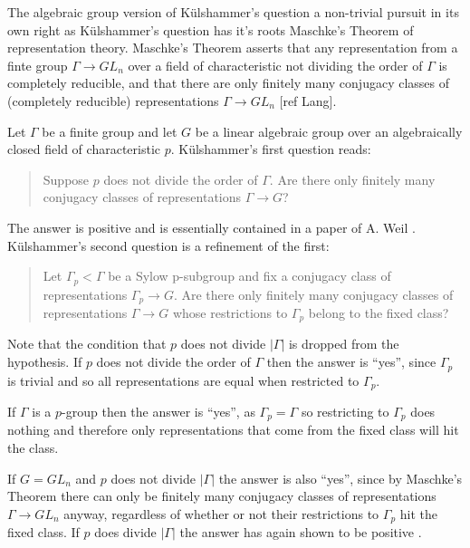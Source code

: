The algebraic group version of K\"ulshammer's question a non-trivial pursuit in its own right as K\"ulshammer's question has it's roots Maschke's Theorem of representation theory. Maschke's Theorem asserts that any representation from a finte group $\Gamma \rightarrow GL_n$ over a field of characteristic not dividing the order of $\Gamma$ is completely reducible, and that there are only finitely many conjugacy classes of (completely reducible) representations $\Gamma \rightarrow GL_n$ [ref Lang].

Let $\Gamma$ be a finite group and let $G$ be a linear algebraic group over an algebraically closed field of characteristic $p$. K\"ulshammer's first question reads:
\begin{quote}
  Suppose $p$ does not divide the order of $\Gamma$. Are there only finitely many conjugacy classes of representations $\Gamma\rightarrow G$?
\end{quote}
The answer is positive and is essentially contained in a paper of A. Weil \cite{weil1964remarks}. K\"ulshammer's second question is a refinement of the first:
\begin{quote}
  Let $\Gamma_p < \Gamma$ be a Sylow p-subgroup and fix a conjugacy class of representations $\Gamma_p\rightarrow G$. Are there only finitely many conjugacy classes of representations $\Gamma\rightarrow G$ whose restrictions to $\Gamma_p$ belong to the fixed class?
\end{quote}
Note that the condition that $p$ does not divide $|\Gamma|$ is dropped from the hypothesis. If $p$ does not divide the order of $\Gamma$ then the answer is ``yes'', since $\Gamma_p$ is trivial and so all representations are equal when restricted to $\Gamma_p$.

If $\Gamma$ is a $p$-group then the answer is ``yes'', as $\Gamma_p = \Gamma$ so restricting to $\Gamma_p$ does nothing and therefore only representations that come from the fixed class will hit the class.

If $G=GL_n$ and $p$ does not divide $|\Gamma|$ the answer is also ``yes'', since by Maschke's Theorem there can only be finitely many conjugacy classes of representations $\Gamma\rightarrow GL_n$ anyway, regardless of whether or not their restrictions to $\Gamma_p$ hit the fixed class. If $p$ does divide $|\Gamma|$ the answer has again shown to be positive \cite[Theorem]{slodowy1997two}.

